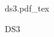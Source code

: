 \documentclass[12pt,a4paper]{article}
\newcommand{\incfig}[1]{%
    \def\svgwidth{\columnwidth}
    {#1.pdf_tex}
}
\begin{document}
\begin{figure}[ht]
    \centering
	\begin{minipage}[c][\totalheight][c]{\columnwidth}
    \incfig{ds3}
    \caption{DS3}
	\end{minipage}
    \label{fig:ds3}
\end{figure}
\end{document}
